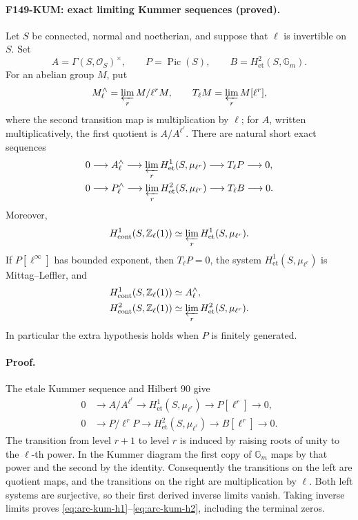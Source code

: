 \paragraph{F149-KUM: exact limiting Kummer sequences (proved).}
Let \(S\) be connected, normal and noetherian, and suppose that \(\ell\)
is invertible on \(S\).  Set
\[
 A=\Gamma(S,\mathcal O_S)^\times,\qquad
 P=\operatorname{Pic}(S),\qquad
 B=H^2_{\mathrm{et}}(S,\mathbb G_m).
\]
For an abelian group \(M\), put
\[
 M^\wedge_\ell=\varprojlim_r M/\ell^rM,
 \qquad
 T_\ell M=\varprojlim_r M[\ell^r],
\]
where the second transition map is multiplication by \(\ell\);
for \(A\), written multiplicatively, the first quotient is
\(A/A^{\ell^r}\).  There are natural short exact sequences
\begin{align}
 0&\longrightarrow A^\wedge_\ell
   \longrightarrow \varprojlim_r H^1_{\mathrm{et}}(S,\mu_{\ell^r})
   \longrightarrow T_\ell P\longrightarrow 0,\label{eq:arc-kum-h1}\\
 0&\longrightarrow P^\wedge_\ell
   \longrightarrow \varprojlim_r H^2_{\mathrm{et}}(S,\mu_{\ell^r})
   \longrightarrow T_\ell B\longrightarrow 0.\label{eq:arc-kum-h2}
\end{align}
Moreover,
\[
 H^1_{\mathrm{cont}}(S,\mathbb Z_\ell(1))
 \simeq \varprojlim_r H^1_{\mathrm{et}}(S,\mu_{\ell^r}).
\]
If \(P[\ell^\infty]\) has bounded exponent, then \(T_\ell P=0\), the
system \(H^1_{\mathrm{et}}(S,\mu_{\ell^r})\) is Mittag--Leffler, and
\begin{align*}
 H^1_{\mathrm{cont}}(S,\mathbb Z_\ell(1))&\simeq A^\wedge_\ell,\\
 H^2_{\mathrm{cont}}(S,\mathbb Z_\ell(1))
 &\simeq \varprojlim_r H^2_{\mathrm{et}}(S,\mu_{\ell^r}).
\end{align*}
In particular the extra hypothesis holds when \(P\) is finitely generated.

\paragraph{Proof.}
The etale Kummer sequence and Hilbert 90 give
\begin{align*}
 0&\longrightarrow A/A^{\ell^r}
   \longrightarrow H^1_{\mathrm{et}}(S,\mu_{\ell^r})
   \longrightarrow P[\ell^r]\longrightarrow 0,\\
 0&\longrightarrow P/\ell^rP
   \longrightarrow H^2_{\mathrm{et}}(S,\mu_{\ell^r})
   \longrightarrow B[\ell^r]\longrightarrow 0.
\end{align*}
The transition from level \(r+1\) to level \(r\) is induced by raising
roots of unity to the \(\ell\)-th power.  In the Kummer diagram the first
copy of \(\mathbb G_m\) maps by that power and the second by the identity.
Consequently the transitions on the left are quotient maps, and the
transitions on the right are multiplication by \(\ell\).  Both left
systems are surjective, so their first derived inverse limits vanish.
Taking inverse limits proves
\eqref{eq:arc-kum-h1}--\eqref{eq:arc-kum-h2}, including the terminal zeros.

